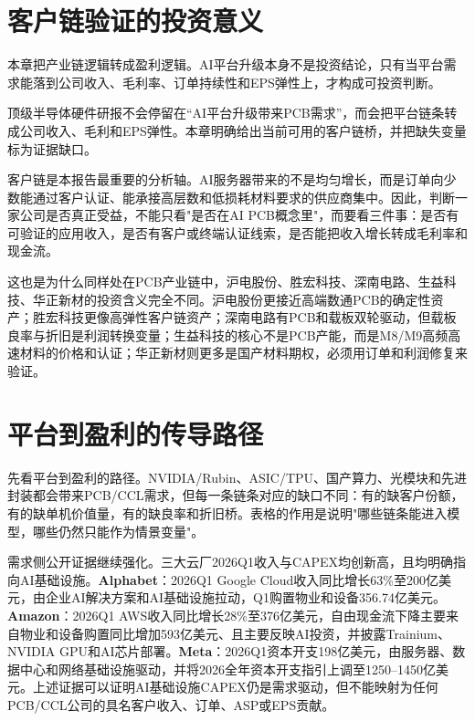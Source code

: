 
\section{客户链验证的投资意义}

本章把产业链逻辑转成盈利逻辑。AI平台升级本身不是投资结论，只有当平台需求能落到公司收入、毛利率、订单持续性和EPS弹性上，才构成可投资判断。

\begin{houseviewbox}[研究升级方向]
顶级半导体硬件研报不会停留在``AI平台升级带来PCB需求''，而会把平台链条转成公司收入、毛利和EPS弹性。本章明确给出当前可用的客户链桥，并把缺失变量标为证据缺口。
\end{houseviewbox}

客户链是本报告最重要的分析轴。AI服务器带来的不是均匀增长，而是订单向少数能通过客户认证、能承接高层数和低损耗材料要求的供应商集中。因此，判断一家公司是否真正受益，不能只看"是否在AI PCB概念里"，而要看三件事：是否有可验证的应用收入，是否有客户或终端认证线索，是否能把收入增长转成毛利率和现金流。

这也是为什么同样处在PCB产业链中，沪电股份、胜宏科技、深南电路、生益科技、华正新材的投资含义完全不同。沪电股份更接近高端数通PCB的确定性资产；胜宏科技更像高弹性客户链资产；深南电路有PCB和载板双轮驱动，但载板良率与折旧是利润转换变量；生益科技的核心不是PCB产能，而是M8/M9高频高速材料的价格和认证；华正新材则更多是国产材料期权，必须用订单和利润修复来验证。

\section{平台到盈利的传导路径}

先看平台到盈利的路径。NVIDIA/Rubin、ASIC/TPU、国产算力、光模块和先进封装都会带来PCB/CCL需求，但每一条链条对应的缺口不同：有的缺客户份额，有的缺单机价值量，有的缺良率和折旧桥。表格的作用是说明"哪些链条能进入模型，哪些仍然只能作为情景变量"。

需求侧公开证据继续强化。三大云厂2026Q1收入与CAPEX均创新高，且均明确指向AI基础设施。\textbf{Alphabet}：2026Q1 Google Cloud收入同比增长63\%至200亿美元，由企业AI解决方案和AI基础设施拉动，Q1购置物业和设备356.74亿美元。\textbf{Amazon}：2026Q1 AWS收入同比增长28\%至376亿美元，自由现金流下降主要来自物业和设备购置同比增加593亿美元、且主要反映AI投资，并披露Trainium、NVIDIA GPU和AI芯片部署。\textbf{Meta}：2026Q1资本开支198亿美元，由服务器、数据中心和网络基础设施驱动，并将2026全年资本开支指引上调至1250--1450亿美元。上述证据可以证明AI基础设施CAPEX仍是需求驱动，但不能映射为任何PCB/CCL公司的具名客户收入、订单、ASP或EPS贡献。

